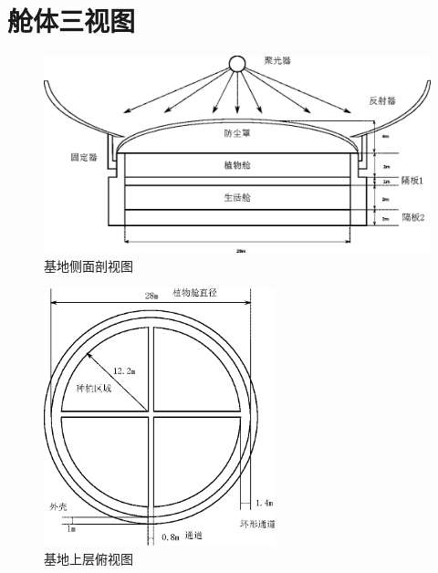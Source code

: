 \section{舱体三视图}
\label{sec:three-view}

\begin{figure}[H]
        \centering
        \includegraphics[width=\textwidth]{figure/zhengmian.eps}
        \caption{基地侧面剖视图}
        \label{fig:zhengmian}
\end{figure}
\begin{figure}[H]
        \centering
        \includegraphics[width=0.6\textwidth]{figure/shangceng.eps}
        \caption{基地上层俯视图}
        \label{fig:shangceng}
\end{figure}
